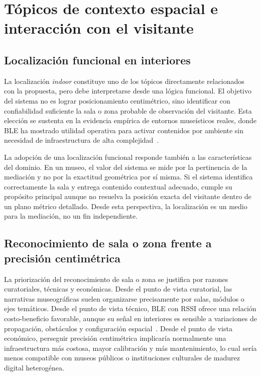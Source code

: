 \section{T\'opicos de contexto espacial e interacci\'on con el visitante}

\subsection{Localizaci\'on funcional en interiores}

La localizaci\'on \textit{indoor} constituye uno de los t\'opicos directamente relacionados con la propuesta, pero debe interpretarse desde una l\'ogica funcional. El objetivo del sistema no es lograr posicionamiento centim\'etrico, sino identificar con confiabilidad suficiente la sala o zona probable de observaci\'on del visitante. Esta elecci\'on se sustenta en la evidencia emp\'irica de entornos muse\'isticos reales, donde BLE ha mostrado utilidad operativa para activar contenidos por ambiente sin necesidad de infraestructura de alta complejidad~\cite{verde2023blemuseum}.

La adopci\'on de una localizaci\'on funcional responde tambi\'en a las caracter\'isticas del dominio. En un museo, el valor del sistema se mide por la pertinencia de la mediaci\'on y no por la exactitud geom\'etrica por s\'i misma. Si el sistema identifica correctamente la sala y entrega contenido contextual adecuado, cumple su prop\'osito principal aunque no resuelva la posici\'on exacta del visitante dentro de un plano m\'etrico detallado. Desde esta perspectiva, la localizaci\'on es un medio para la mediaci\'on, no un fin independiente.

\subsection{Reconocimiento de sala o zona frente a precisi\'on centim\'etrica}

La priorizaci\'on del reconocimiento de sala o zona se justifica por razones curatoriales, t\'ecnicas y econ\'omicas. Desde el punto de vista curatorial, las narrativas museogr\'aficas suelen organizarse precisamente por salas, m\'odulos o ejes tem\'aticos. Desde el punto de vista t\'ecnico, BLE con RSSI ofrece una relaci\'on costo-beneficio favorable, aunque su se\~nal en interiores es sensible a variaciones de propagaci\'on, obst\'aculos y configuraci\'on espacial~\cite{verde2023blemuseum,leitch2023indoor}. Desde el punto de vista econ\'omico, perseguir precisi\'on centim\'etrica implicar\'ia normalmente una infraestructura m\'as costosa, mayor calibraci\'on y m\'as mantenimiento, lo cual ser\'ia menos compatible con museos p\'ublicos o instituciones culturales de madurez digital heterog\'enea.

